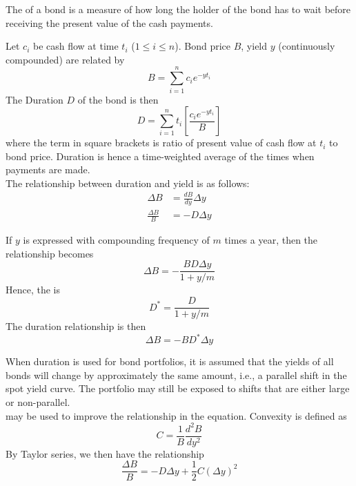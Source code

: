 \documentclass[a4paper,oneside,openany]{book}
\begin{document}
\begin{definition}
The  of a bond is a measure of how long the holder of the bond has to wait before receiving the present value of the cash payments.
\end{definition}

Let $c_i$ be cash flow at time $t_i$ ($1 \leq i \leq n$). Bond price $B$, yield $y$ (continuously compounded) are related by
\begin{equation*}
B = \sum\limits_{i=1}^n c_i e^{-y t_i} \nonumber
\end{equation*}
The Duration $D$ of the bond is then
\begin{equation*}
D = \sum\limits_{i=1}^n t_i \left[ \frac{c_i e^{-y t_i}}{B} \right] \nonumber
\end{equation*}
where the term in square brackets is ratio of present value of cash flow at $t_i$ to bond price. Duration is hence a time-weighted average of the times when payments are made.\\
The relationship between duration and yield is as follows:
\begin{align*}
\Delta B &= \frac{dB}{dy} \Delta y \nonumber \\
\frac{\Delta B}{B} &= - D \Delta y \nonumber
\end{align*}

If $y$ is expressed with compounding frequency of $m$ times a year, then the relationship becomes
\begin{equation*}
\Delta B = - \frac{BD \Delta y}{1 + y/m} \nonumber
\end{equation*}
Hence, the  is 
\begin{equation*}
D^* = \frac{D}{1 + y/m} \nonumber
\end{equation*}
The duration relationship is then
\begin{equation*}
\Delta B = - B D^* \Delta y \nonumber
\end{equation*}

When duration is used for bond portfolios, it is assumed that the yields of all bonds will change by approximately the same amount, i.e., a parallel shift in the spot yield curve. The portfolio may still be exposed to shifts that are either large or non-parallel.\\
 may be used to improve the relationship in the equation. Convexity is defined as
\begin{equation*}
C = \frac{1}{B} \frac{d^2 B}{dy^2} \nonumber
\end{equation*}
By Taylor series, we then have the relationship
\begin{equation*}
\frac{\Delta B}{B} = -D \Delta y + \frac{1}{2}C(\Delta y)^2 \nonumber
\end{equation*}
\end{document}
